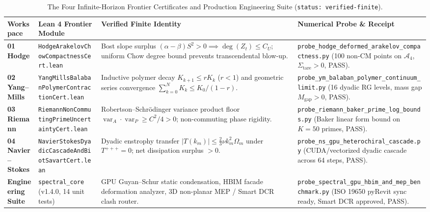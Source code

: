 \documentclass[11pt,a4paper]{article}
\begin{document}
\begin{table}[htbp]
\centering
\caption{The Four Infinite-Horizon Frontier Certificates and Production Engineering Suite (\texttt{status: verified-finite}).}
\label{tab:frontier_and_engineering}
\footnotesize
\begin{tabular}{@{}>{\raggedright\arraybackslash}p{2.2cm}>{\raggedright\arraybackslash}p{4.2cm}>{\raggedright\arraybackslash}p{4.0cm}>{\raggedright\arraybackslash}p{3.8cm}@{}}
\toprule
\textbf{Workspace} & \textbf{Lean 4 Frontier Module} & \textbf{Verified Finite Identity} & \textbf{Numerical Probe \& Receipt} \\
\midrule
\textbf{01 Hodge} & \texttt{HodgeArakelovChowCompactnessCert.lean} & Bost slope surplus $(\alpha - \beta)S^2 > 0 \implies \deg(Z_t) \le C_U$; uniform Chow degree bound prevents transcendental blow-up. & \texttt{probe\_hodge\_deformed\_arakelov\_compactness.py} (100 non-CM points on $\mathcal{A}_4$, $\Sigma_{\mathrm{tare}} > 0$, PASS). \\
\addlinespace
\textbf{02 Yang--Mills} & \texttt{YangMillsBalabanPolymerContractionCert.lean} & Inductive polymer decay $K_{k+1} \le r K_k$ ($r < 1$) and geometric series convergence $\sum_{k=0}^N K_k \le K_0 / (1 - r)$. & \texttt{probe\_ym\_balaban\_polymer\_continuum\_limit.py} (16 dyadic RG levels, mass gap $M_{\mathrm{gap}} > 0$, PASS). \\
\addlinespace
\textbf{03 Riemann} & \texttt{RiemannNonCommutingPrimeUncertaintyCert.lean} & Robertson--Schr\"odinger variance product floor $\operatorname{var}_A \cdot \operatorname{var}_P \ge C^2 / 4 > 0$; non-commuting phase rigidity. & \texttt{probe\_riemann\_baker\_prime\_log\_bounds.py} (Baker linear form bound on $K=50$ primes, PASS). \\
\addlinespace
\textbf{04 Navier--Stokes} & \texttt{NavierStokesDyadicCascadeAndBiotSavartCert.lean} & Dyadic enstrophy transfer $|T(k_m)| \le \frac{2}{3} \nu k_m^2 \Omega_m$ under $T^{+++} = 0$; net dissipation surplus $> 0$. & \texttt{probe\_ns\_gpu\_heterochiral\_cascade.py} (CUDA/vectorized dyadic cascade across 64 steps, PASS). \\
\addlinespace
\textbf{Engineering Suite} & \texttt{spectral\_core} (v1.4.0, 14 unit tests) & GPU Guyan--Schur static condensation, HBIM facade deformation analyzer, 3D non-planar MEP / Smart DCR clash router. & \texttt{probe\_spectral\_gpu\_hbim\_and\_mep\_benchmark.py} (ISO 19650 pyRevit sync ready, Smart DCR approved, PASS). \\
\bottomrule
\end{tabular}
\end{table}
\end{document}
